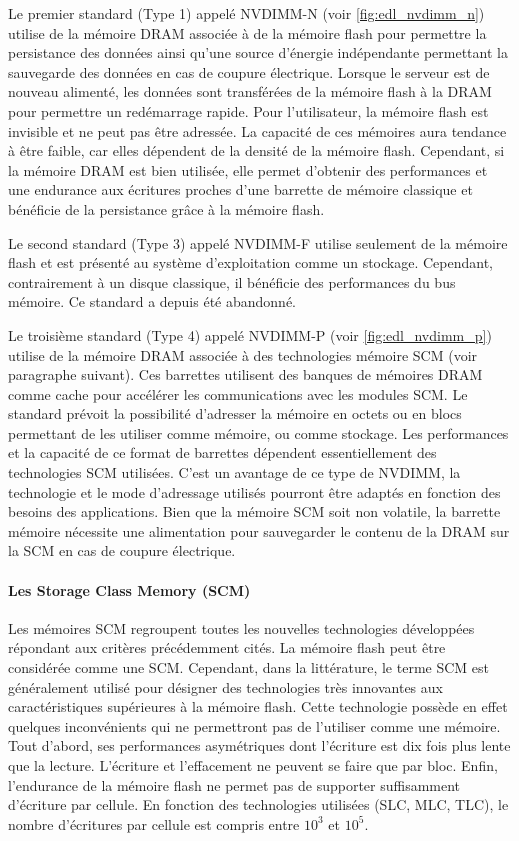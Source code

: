         Le premier standard (Type 1) appelé NVDIMM-N (voir \autoref{fig:edl_nvdimm_n}) utilise de la mémoire DRAM associée à de la mémoire flash pour permettre la persistance des données ainsi qu'une source d'énergie indépendante permettant la sauvegarde des données en cas de coupure électrique. Lorsque le serveur est de nouveau alimenté, les données sont transférées de la mémoire flash à la DRAM pour permettre un redémarrage rapide. Pour l'utilisateur, la mémoire flash est invisible et ne peut pas être adressée. La capacité de ces mémoires aura tendance à être faible, car elles dépendent de la densité de la mémoire flash. Cependant, si la mémoire DRAM est bien utilisée, elle permet d'obtenir des performances et une endurance aux écritures proches d'une barrette de mémoire classique et bénéficie de la persistance grâce à la mémoire flash. 
            
        Le second standard (Type 3) appelé NVDIMM-F utilise seulement de la mémoire flash et est présenté au système d'exploitation comme un stockage. Cependant, contrairement à un disque classique, il bénéficie des performances du bus mémoire. Ce standard a depuis été abandonné. 
        
        Le troisième standard (Type 4) appelé NVDIMM-P (voir \autoref{fig:edl_nvdimm_p}) utilise de la mémoire DRAM associée à des technologies mémoire SCM (voir paragraphe suivant). Ces barrettes utilisent des banques de mémoires DRAM comme cache pour accélérer les communications avec les modules SCM. Le standard prévoit la possibilité d'adresser la mémoire en octets ou en blocs permettant de les utiliser comme mémoire, ou comme stockage. Les performances et la capacité de ce format de barrettes dépendent essentiellement des technologies SCM utilisées. C'est un avantage de ce type de NVDIMM, la technologie et le mode d'adressage utilisés pourront être adaptés en fonction des besoins des applications. Bien que la mémoire SCM soit non volatile, la barrette mémoire nécessite une alimentation pour sauvegarder le contenu de la DRAM sur la SCM en cas de coupure électrique.

    \paragraph{Les Storage Class Memory (SCM)}\label{sec:SCM}
    
        Les mémoires SCM regroupent toutes les nouvelles technologies développées répondant aux critères précédemment cités. La mémoire flash peut être considérée comme une SCM. Cependant, dans la littérature, le terme SCM est généralement utilisé pour désigner des technologies très innovantes aux caractéristiques supérieures à la mémoire flash. Cette technologie possède en effet quelques inconvénients qui ne permettront pas de l'utiliser comme une mémoire. Tout d'abord, ses performances asymétriques dont l'écriture est dix fois plus lente que la lecture. L'écriture et l'effacement ne peuvent se faire que par bloc. Enfin, l'endurance de la mémoire flash ne permet pas de supporter suffisamment d'écriture par cellule. En fonction des technologies utilisées (SLC, MLC, TLC), le nombre d'écritures par cellule est compris entre $10^3$ et $10^5$.  
        
